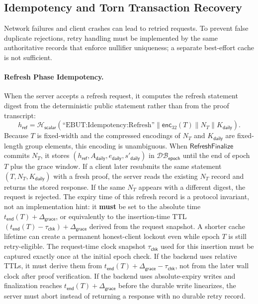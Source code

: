 \documentclass[11pt]{article}
\theoremstyle{definitionstyle}
\theoremstyle{plain}
\newcommand{\DB}{\mathcal{DB}}
\begin{document}
\subsection{Idempotency and Torn Transaction Recovery}

Network failures and client crashes can lead to retried requests. To prevent false duplicate rejections, retry handling must be implemented by the same authoritative records that enforce nullifier uniqueness; a separate best-effort cache is not sufficient.

\paragraph{Refresh Phase Idempotency.}
When the server accepts a refresh request, it computes the refresh statement digest from the deterministic public statement rather than from the proof transcript:
\[
h_{\mathsf{ref}} = \mathcal{H}_{\mathsf{scalar}}\!\left(\text{``EBUT:Idempotency:Refresh''} \parallel \mathsf{enc}_{32}(T) \parallel N_T \parallel K_{\mathsf{daily}} \right).
\]
Because $T$ is fixed-width and the compressed encodings of $N_T$ and $K_{\mathsf{daily}}$ are fixed-length group elements, this encoding is unambiguous. When $\mathsf{RefreshFinalize}$ commits $N_T$, it stores $(h_{\mathsf{ref}}, A_{\mathsf{daily}}, e_{\mathsf{daily}}, s'_{\mathsf{daily}})$ in $\DB_{\mathsf{epoch}}$ until the end of epoch $T$ plus the grace window. If a client later resubmits the same statement $(T,N_T,K_{\mathsf{daily}})$ with a fresh proof, the server reads the existing $N_T$ record and returns the stored response. If the same $N_T$ appears with a different digest, the request is rejected.
The expiry time of this refresh record is a protocol invariant, not an implementation hint: it \textbf{must} be set to the absolute time $t_{\mathsf{end}}(T)+\Delta_{\mathsf{grace}}$, or equivalently to the insertion-time TTL $(t_{\mathsf{end}}(T)-\tau_{\mathsf{chk}})+\Delta_{\mathsf{grace}}$ derived from the request snapshot. A shorter cache lifetime can create a permanent honest-client lockout even while epoch $T$ is still retry-eligible.
The request-time clock snapshot $\tau_{\mathsf{chk}}$ used for this insertion must be captured exactly once at the initial epoch check. If the backend uses relative TTLs, it must derive them from $t_{\mathsf{end}}(T)+\Delta_{\mathsf{grace}}-\tau_{\mathsf{chk}}$, not from the later wall clock after proof verification. If the backend uses absolute-expiry writes and finalization reaches $t_{\mathsf{end}}(T)+\Delta_{\mathsf{grace}}$ before the durable write linearizes, the server must abort instead of returning a response with no durable retry record.
\end{document}
